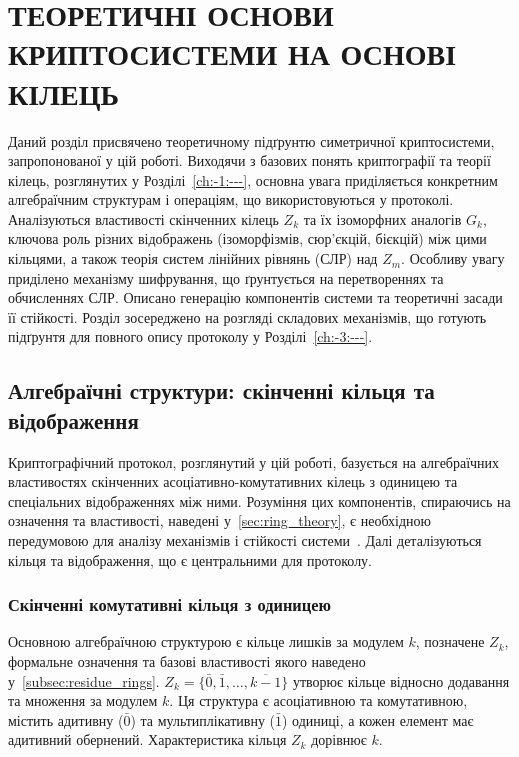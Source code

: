 \chapter{ТЕОРЕТИЧНІ ОСНОВИ КРИПТОСИСТЕМИ НА ОСНОВІ КІЛЕЦЬ}\label{ch:-2:------}

Даний розділ присвячено теоретичному підґрунтю симетричної криптосистеми, запропонованої у цій роботі.
Виходячи з базових понять криптографії та теорії кілець, розглянутих у Розділі~\ref{ch:-1:---}, основна увага приділяється конкретним алгебраїчним структурам і операціям, що використовуються у протоколі.
Аналізуються властивості скінченних кілець $Z_k$ та їх ізоморфних аналогів $G_k$, ключова роль різних відображень (ізоморфізмів, сюр'єкцій, бієкцій) між цими кільцями, а також теорія систем лінійних рівнянь (СЛР) над $Z_m$.
Особливу увагу приділено механізму шифрування, що ґрунтується на перетвореннях та обчисленнях СЛР.
Описано генерацію компонентів системи та теоретичні засади її стійкості.
Розділ зосереджено на розгляді складових механізмів, що готують підґрунтя для повного опису протоколу у Розділі~\ref{ch:-3:---}.

\section{Алгебраїчні структури: скінченні кільця та відображення}
\label{sec:algebraic_structures}
Криптографічний протокол, розглянутий у цій роботі, базується на алгебраїчних властивостях скінченних асоціативно-комутативних кілець з одиницею та спеціальних відображеннях між ними.
Розуміння цих компонентів, спираючись на означення та властивості, наведені у~\ref{sec:ring_theory}, є необхідною передумовою для аналізу механізмів і стійкості системи~\cite{6, 21}.
Далі деталізуються кільця та відображення, що є центральними для протоколу.

\subsection{Скінченні комутативні кільця з одиницею}
\label{subsec:finite_rings}
Основною алгебраїчною структурою є кільце лишків за модулем $k$, позначене $Z_k$, формальне означення та базові властивості якого наведено у~\ref{subsec:residue_rings}.
$Z_k = \{\bar{0}, \bar{1}, \ldots, \overline{k-1}\}$ утворює кільце відносно додавання та множення за модулем $k$.
Ця структура є асоціативною та комутативною, містить адитивну ($\bar{0}$) та мультиплікативну ($\bar{1}$) одиниці, а кожен елемент має адитивний обернений.
Характеристика кільця $Z_k$ дорівнює $k$.

